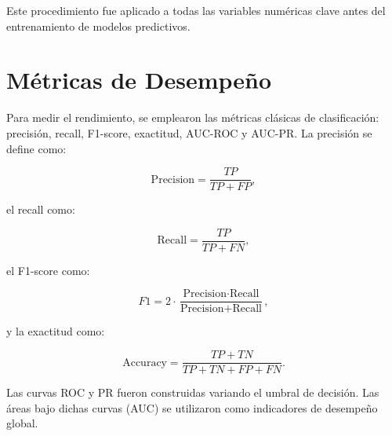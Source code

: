 Este procedimiento fue aplicado a todas las variables numéricas clave antes del entrenamiento de modelos predictivos.




\section{Métricas de Desempeño}\label{subsec:metricas-desempenio}

Para medir el rendimiento, se emplearon las métricas clásicas de clasificación: precisión, recall, F1-score, exactitud, AUC-ROC y AUC-PR. La precisión se define como:

\begin{equation}
\text{Precision} = \frac{TP}{TP + FP},
\end{equation}

el recall como:

\begin{equation}
\text{Recall} = \frac{TP}{TP + FN},
\end{equation}

el F1-score como:

\begin{equation}
F1 = 2 \cdot \frac{\text{Precision} \cdot \text{Recall}}{\text{Precision} + \text{Recall}},
\end{equation}

y la exactitud como:

\begin{equation}
\text{Accuracy} = \frac{TP + TN}{TP + TN + FP + FN}.
\end{equation}

Las curvas ROC y PR fueron construidas variando el umbral de decisión. Las áreas bajo dichas curvas (AUC) se utilizaron como indicadores de desempeño global.

